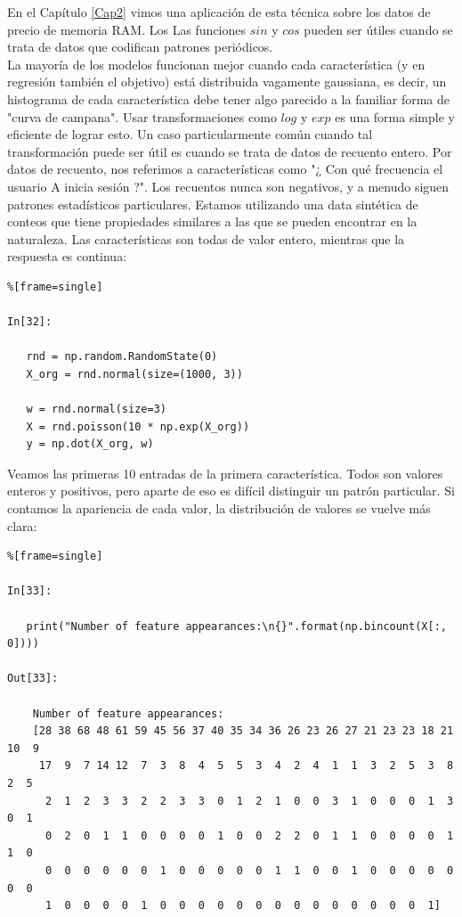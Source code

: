 En el Capítulo \ref{Cap2} vimos una aplicación de esta técnica sobre los datos de precio de memoria RAM. Los
Las funciones $ sin $ y $ cos $ pueden ser útiles cuando se trata de datos que codifican patrones  periódicos.\\

La mayoría de los modelos funcionan mejor cuando cada característica (y en regresión también el objetivo) está distribuida vagamente gaussiana, es decir, un histograma de cada característica debe tener algo parecido a la familiar forma de "{}curva de campana". 
Usar transformaciones como $log$  y  $ exp$  es una forma simple y eficiente de lograr esto. Un caso particularmente común cuando tal transformación puede ser útil es cuando se trata de datos de recuento entero.  Por datos de recuento, nos referimos a características como "{}¿ Con qué frecuencia el usuario A inicia sesión ?"{}. Los recuentos nunca son negativos, y a menudo siguen patrones estadísticos particulares. Estamos utilizando una data sintética de conteos que tiene propiedades similares a las que se pueden encontrar en la naturaleza. Las características son todas de valor entero, mientras que la respuesta es continua:\\


\begin{lstlisting}%[frame=single]

In[32]:

   rnd = np.random.RandomState(0)
   X_org = rnd.normal(size=(1000, 3))
   
   w = rnd.normal(size=3)
   X = rnd.poisson(10 * np.exp(X_org))
   y = np.dot(X_org, w)

\end{lstlisting}


Veamos las primeras 10 entradas de la primera característica. Todos son valores enteros y positivos, pero aparte de eso es difícil distinguir un patrón particular. Si contamos la apariencia de cada valor, la distribución de valores se vuelve más clara:\\

\begin{lstlisting}%[frame=single]

In[33]:

   print("Number of feature appearances:\n{}".format(np.bincount(X[:, 0])))

Out[33]:
 
    Number of feature appearances:
    [28 38 68 48 61 59 45 56 37 40 35 34 36 26 23 26 27 21 23 23 18 21 10  9 
     17  9  7 14 12  7  3  8  4  5  5  3  4  2  4  1  1  3  2  5  3  8  2  5 
      2  1  2  3  3  2  2  3  3  0  1  2  1  0  0  3  1  0  0  0  1  3  0  1 
      0  2  0  1  1  0  0  0  0  1  0  0  2  2  0  1  1  0  0  0  0  1  1  0
      0  0  0  0  0  0  1  0  0  0  0  0  1  1  0  0  1  0  0  0  0  0  0  0
      1  0  0  0  0  1  0  0  0  0  0  0  0  0  0  0  0  0  0  0  1]
\end{lstlisting}

